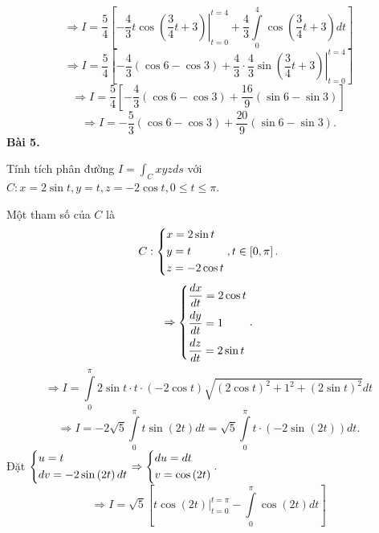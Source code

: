 \documentclass[12pt,a4paper]{article}
\begin{document}
\[ \Rightarrow I = \frac{5}{4}\left[ {\left. { - \frac{4}{3}t\cos \left( {\frac{3}{4}t + 3} \right)} \right|_{t = 0}^{t = 4} + \frac{4}{3}\int\limits_0^4 {\cos \left( {\frac{3}{4}t + 3} \right)dt} } \right]\]
\[ \Rightarrow I = \frac{5}{4}\left[ { - \frac{4}{3}\left( {\cos 6 - \cos 3} \right) + \frac{4}{3} \cdot \frac{4}{3}\left. {\sin \left( {\frac{3}{4}t + 3} \right)} \right|_{t = 0}^{t = 4}} \right]\]
\[ \Rightarrow I = \frac{5}{4}\left[ { - \frac{4}{3}\left( {\cos 6 - \cos 3} \right) + \frac{{16}}{9}\left( {\sin 6 - \sin 3} \right)} \right]\]
\[ \Rightarrow I =  - \frac{5}{3}\left( {\cos 6 - \cos 3} \right) + \frac{{20}}{9}\left( {\sin 6 - \sin 3} \right).\]
\textbf{Bài 5.}
\begin{mybox}
Tính tích phân đường \(I = \int_C {xyzds} \) với \(C:x = 2\sin t,y = t,z =  - 2\cos t,0 \leqslant t \leqslant \pi. \)
\end{mybox}
Một tham số của \(C\) là 
\[C:\left\{ \begin{gathered}
  x = 2\sin t \hfill \\
  y = t \hfill \\
  z =  - 2\cos t \hfill \\ 
\end{gathered}  \right.,t \in \left[ {0,\pi } \right].\]
\[ \Rightarrow \left\{ \begin{gathered}
  \frac{{dx}}{{dt}} = 2\cos t \hfill \\
  \frac{{dy}}{{dt}} = 1 \hfill \\
  \frac{{dz}}{{dt}} = 2\sin t \hfill \\ 
\end{gathered}  \right..\]
\[ \Rightarrow I = \int\limits_0^\pi  {2\sin t \cdot t \cdot } \left( { - 2\cos t} \right)\sqrt {{{\left( {2\cos t} \right)}^2} + {1^2} + {{\left( {2\sin t} \right)}^2}} dt\]
\[ \Rightarrow I =  - 2\sqrt 5 \int\limits_0^\pi  {t\sin \left( {2t} \right)} dt = \sqrt 5 \int\limits_0^\pi  {t \cdot \left( { - 2\sin \left( {2t} \right)} \right)} dt.\]
Đặt \(\left\{ \begin{gathered}
  u = t \hfill \\
  dv =  - 2\sin \left( {2t} \right)dt \hfill \\ 
\end{gathered}  \right. \Rightarrow \left\{ \begin{gathered}
  du = dt \hfill \\
  v = \cos \left( {2t} \right) \hfill \\ 
\end{gathered}  \right..\)
\[ \Rightarrow I = \sqrt 5 \left[ {\left. {t\cos \left( {2t} \right)} \right|_{t = 0}^{t = \pi } - \int\limits_0^\pi  {\cos \left( {2t} \right)dt} } \right]\]
\end{document}
